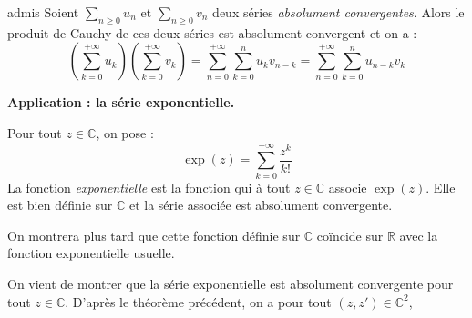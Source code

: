 \documentclass[french,11pt,twoside]{VcCours}
\newcommand{\Sum}[2]{\ensuremath{\textstyle{\sum\limits_{#1}^{#2}}}}
\begin{document}
\medskip

\begin{Theoreme}{admis}
Soient $\Sum{n \geq 0}{} u_n$ et $\Sum{n \geq 0}{} v_n$ deux séries \emph{absolument convergentes}. Alors le produit de Cauchy de ces deux séries est absolument convergent et on a :
$$ \left( \sum_{k=0}^{+ \infty} u_k \right)\left( \sum_{k=0}^{+ \infty} v_k \right) =  \sum_{n=0}^{+ \infty} \sum_{k=0}^n u_k v_{n-k} = \sum_{n=0}^{+ \infty} \sum_{k=0}^n u_{n-k} v_{k}$$
\end{Theoreme}

\textbf{Application : la série exponentielle.}

\begin{TheoremeDefinition}{} Pour tout $z \in \mathbb{C}$, on pose :
$$ \exp(z) = \sum_{k=0}^{+\infty} \frac{z^k}{k!} $$
La fonction \emph{exponentielle} est la fonction qui à tout $z \in \mathbb{C}$ associe $\exp(z)$. Elle est bien définie sur $\mathbb{C}$ et la série associée est absolument convergente.
\end{TheoremeDefinition}

\begin{Demonstration}{} 

\vspace{6.5cm}
%
%
%
\end{Demonstration}

\begin{Remarque}{} On montrera plus tard que cette fonction définie sur $\mathbb{C}$ coïncide sur $\mathbb{R}$ avec la fonction exponentielle usuelle.
\end{Remarque}

On vient de montrer que la série exponentielle est absolument convergente pour tout $z \in \mathbb{C}$. D'après le théorème précédent, on a pour tout $(z,z') \in \mathbb{C}^2$,

\end{document}
